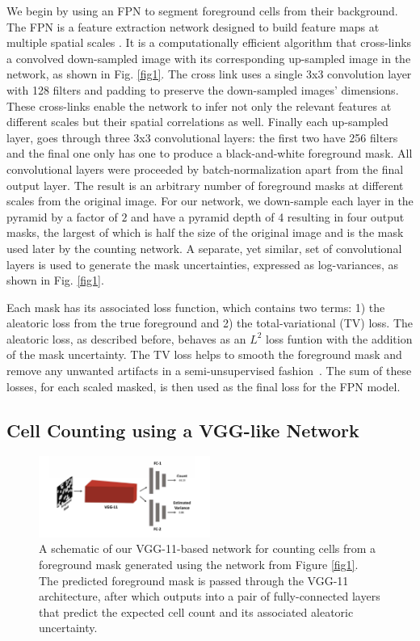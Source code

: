 \documentclass[10pt,twocolumn,letterpaper]{article}
\begin{document}
We begin by using an FPN to segment foreground cells from their background.
The FPN is a feature extraction network designed to build feature maps at multiple spatial scales \cite{fpn2016}.
It is a computationally efficient algorithm that cross-links a convolved down-sampled image with its corresponding up-sampled image in the network, as shown in Fig. \ref{fig1}. The cross link uses a single 3x3 convolution layer with 128 filters and padding to preserve the down-sampled images' dimensions. 
These cross-links enable the network to infer not only the relevant features at different scales but their spatial correlations as well.
Finally each up-sampled layer, goes through three 3x3 convolutional layers: the first two have 256 filters and the final one only has one to produce a black-and-white foreground mask.
All convolutional layers were proceeded by batch-normalization apart from the final output layer. The result is an arbitrary number of foreground masks at different scales from the original image.
For our network, we down-sample each layer in the pyramid by a factor of $2$ and have a pyramid depth of 4 resulting in four output masks, the largest of which is half the size of the original image and is the mask used later by the counting network.
A separate, yet similar, set of convolutional layers is used to generate the mask uncertainties, expressed as log-variances, as shown in Fig. \ref{fig1}.

Each mask has its associated loss function, which contains two terms: 1) the aleatoric loss from the true foreground and 2) the total-variational (TV) loss. The aleatoric loss, as described before, behaves as an $L^2$ loss funtion with the addition of the mask uncertainty. The TV loss helps to smooth the foreground mask and remove any unwanted artifacts in a semi-unsupervised fashion~\cite{tvloss}. The sum of these losses, for each scaled masked, is then used as the final loss for the FPN model.



\subsection{Cell Counting using a VGG-like Network}

\begin{figure}[!h]
\centering
\includegraphics[width=0.5\textwidth]{count}
\caption{A schematic of our VGG-11-based network for counting cells from a foreground mask generated using the network from Figure \ref{fig1}. The predicted foreground mask is passed through the VGG-11 architecture, after which outputs into a pair of fully-connected layers that predict the expected cell count and its associated aleatoric uncertainty.}
\label{fig2}
\end{figure}
\end{document}
